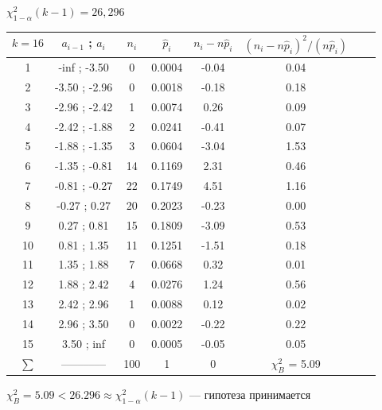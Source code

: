 \documentclass[12pt]{article}
\begin{document}
$\chi^2_{1 - \alpha}(k - 1) = 26,296$
\begin{center}
    \begin{tabular}{ | c | c | c | c | c | c | c | c |}
        \hline
        $k = 16$ & $a_{i - 1}$ ; $a_{i}$ & $n_i$ & $\hat p_i$ & $n_i - n \hat p_i$ & $(n_i - n \hat p_i)^2/(n \hat p_i)$ \\ \hline
        1  &  -inf ; -3.50  &  0  &  0.0004  &  -0.04  &  0.04  \\ \hline
        2  &  -3.50 ; -2.96  &  0  &  0.0018  &  -0.18  &  0.18 \\ \hline
        3  &  -2.96 ; -2.42  &  1  &  0.0074  &  0.26  &  0.09  \\ \hline
        4  &  -2.42 ; -1.88  &  2  &  0.0241  &  -0.41  &  0.07 \\ \hline
        5  &  -1.88 ; -1.35  &  3  &  0.0604  &  -3.04  &  1.53 \\ \hline
        6  &  -1.35 ; -0.81  &  14  &  0.1169  &  2.31  &  0.46 \\ \hline
        7  &  -0.81 ; -0.27  &  22  &  0.1749  &  4.51  &  1.16 \\ \hline
        8  &  -0.27 ; 0.27  &  20  &  0.2023  &  -0.23  &  0.00 \\ \hline
        9  &  0.27 ; 0.81  &  15  &  0.1809  &  -3.09  &  0.53  \\ \hline
        10  &  0.81 ; 1.35  &  11  &  0.1251  &  -1.51  &  0.18 \\ \hline
        11  &  1.35 ; 1.88  &  7  &  0.0668  &  0.32  &  0.01   \\ \hline
        12  &  1.88 ; 2.42  &  4  &  0.0276  &  1.24  &  0.56   \\ \hline
        13  &  2.42 ; 2.96  &  1  &  0.0088  &  0.12  &  0.02   \\ \hline
        14  &  2.96 ; 3.50  &  0  &  0.0022  &  -0.22  &  0.22  \\ \hline
        15  &  3.50 ; inf  &  0  &  0.0005  &  -0.05  &  0.05   \\ \hline
        $\sum$ &  –––––––– &  100  &  1  & 0 & $\chi^2_{B}$ = 5.09 \\ \hline
    \end{tabular}
\end{center}

$\chi^2_{B} = 5.09 < 26.296 \approx \chi^2_{1 - \alpha}(k - 1)$ –– гипотеза принимается

\end{document}
